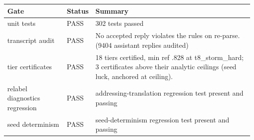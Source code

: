 \begin{tabularx}{\linewidth}{llX}
\toprule
Gate & Status & Summary \\
\midrule
unit tests & PASS & 302 tests passed \\
transcript audit & PASS & No accepted reply violates the rules on re-parse. (9404 assistant replies audited) \\
tier certificates & PASS & 18 tiers certified, min ref .828 at t8\_storm\_hard; 3 certificates above their analytic ceilings (seed luck, anchored at ceiling). \\
relabel diagnostics regression & PASS & addressing-translation regression test present and passing \\
seed determinism & PASS & seed-determinism regression test present and passing \\
\bottomrule
\end{tabularx}
